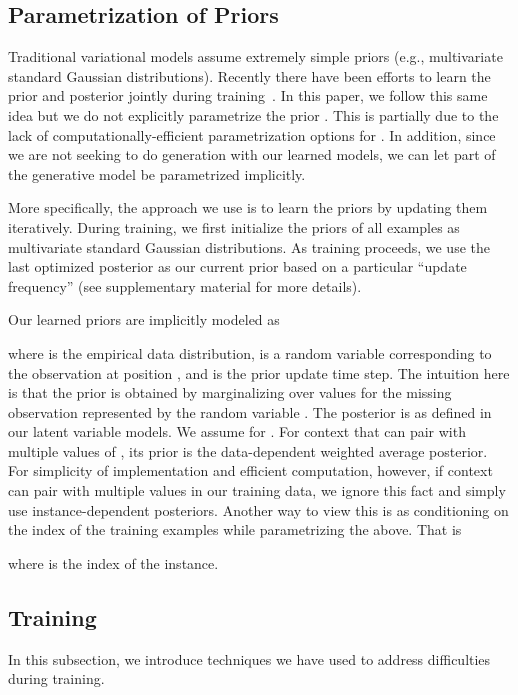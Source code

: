 \documentclass[11pt,a4paper]{article}
\begin{document}
\subsection{Parametrization of Priors}
\label{prior}

Traditional variational models assume extremely simple priors (e.g., multivariate standard Gaussian distributions). Recently there have been efforts to learn the prior and posterior jointly during training~\cite{fraccaro2016sequential,serban2017piecewise,tomczak2017vae}.
In this paper, we follow this same idea  but we do not explicitly parametrize the prior  . This is partially due to the lack of computationally-efficient parametrization options for . In addition, since we are not seeking to do generation with our learned models, we can let part of the generative model be parametrized implicitly.

More specifically, the approach we use is to learn the priors by updating them iteratively. During training, we first initialize the priors of all examples as multivariate standard Gaussian distributions. As  training proceeds, we use the last optimized posterior as our current prior based on a particular ``update frequency'' (see supplementary material for more details).

Our learned priors are implicitly modeled as

\noindent

where  is the empirical data distribution,  is a random variable corresponding to the observation at position , and  is the prior update time step.
The intuition here is that the prior is obtained by marginalizing over values for the missing observation represented by the random variable . The posterior  is as defined in our latent variable models.
We assume  for .
For context  that can pair with multiple values of , its prior is the data-dependent weighted average posterior.
For simplicity of implementation and efficient computation, however, if context  can pair with multiple values in our training data, we ignore this fact and simply use instance-dependent posteriors.
Another way to view this is as conditioning on the index of the training examples while parametrizing the above. That is



\noindent where  is the index of the instance.

\subsection{Training}
In this subsection, we introduce techniques we have used to address difficulties during training.
\end{document}
